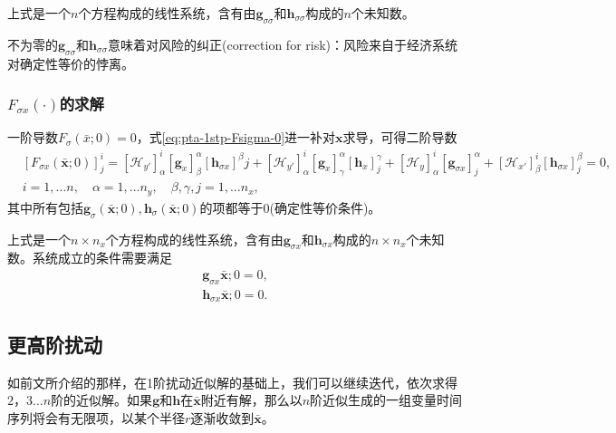 上式是一个$n$个方程构成的线性系统，含有由$\bm{g}_{\sigma \sigma}$和$\bm{h}_{\sigma \sigma}$构成的$n$个未知数。

不为零的$\bm{g}_{\sigma \sigma}$和$\bm{h}_{\sigma \sigma}$意味着对风险的纠正(correction for risk)：风险来自于经济系统对确定性等价的悖离。

\subsubsection{$F_{\sigma x}(\cdot)$的求解}
一阶导数$F_{\sigma}(\bar{x};0) =0$，式\eqref{eq:pta-1stp-Fsigma-0}进一补对$\bm{x}$求导，可得二阶导数
\begin{equation}
  \begin{split}
  \label{eq:pta-F-zero-case-sigmax}
  &\left[ F_{\sigma x} (\bar{\bm{x}};0) \right]^{i}_{j} =
  \left[ \mathcal{H}_{y'} \right]^{i}_{\alpha}
  \left[ \bm{g}_{x} \right]^{\alpha}_{\beta}
  \left[ \bm{h}_{\sigma x} \right]^{\beta}{j}
  + \left[ \mathcal{H}_{y'} \right]^{i}_{\alpha}
  \left[ \bm{g}_{x} \right]^{\alpha}_{\gamma}
  \left[ \bm{h}_{x} \right]^{\gamma}_{j}
   +  \left[ \mathcal{H}_{y} \right]^{i}_{\alpha}
   \left[ \bm{g}_{\sigma x} \right]^{\alpha}_{j}
   + \left[ \mathcal{H}_{x'} \right]^{i}_{\beta}
   \left[ \bm{h}_{\sigma x} \right]^{\beta}_{j}=0,\\
   &i=1, \ldots n, \quad \alpha = 1, \ldots n_y, \quad \beta, \gamma, j = 1, \ldots n_x,
\end{split}
\end{equation}
其中所有包括$\bm{g}_{\sigma}(\bar{\bm{x}};0),\bm{h}_{\sigma}(\bar{\bm{x}};0)$的项都等于0(确定性等价条件)。

上式是一个$n \times n_x$个方程构成的线性系统，含有由$\bm{g}_{\sigma x}$和$\bm{h}_{\sigma x}$构成的$n \times n_x$个未知数。系统成立的条件需要满足
\begin{equation}
  \label{eq:pta-F-zero-case-sigmax-solution}
  \begin{split}
    \bm{g}_{\sigma x}{\bar{\bm{x}};0} = 0, \\
    \bm{h}_{\sigma x}{\bar{\bm{x}};0} = 0.
  \end{split}
\end{equation}

\subsection{更高阶扰动}
如前文所介绍的那样，在1阶扰动近似解的基础上，我们可以继续迭代，依次求得$2，3\ldots n$阶的近似解。如果$\bm{g}$和$\bm{h}$在$\bar{\bm{x}}$附近有解，那么以$n$阶近似生成的一组变量时间序列将会有无限项，以某个半径$r$逐渐收敛到$\bar{\bm{x}}$。

